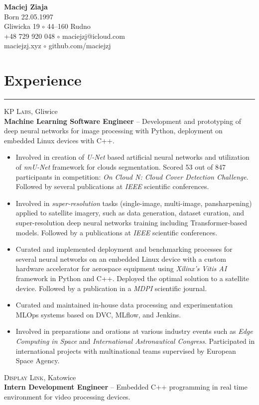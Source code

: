 \documentclass{article}
\begin{document}
\hfill
\begin{minipage}{0.5\textwidth}\raggedleft
	{\Large \textbf{Maciej Ziaja}} \\
	Born 22.05.1997 \\
	Gliwicka 19 $\circ$ 44--160 Rudno \\
	+48 729 920 048 $\circ$ maciejzj@icloud.com \\
	maciejzj.xyz $\circ$ github.com/maciejzj
\end{minipage}

\section*{Experience}

\hrule \medskip

\textsc{KP Labs}, Gliwice \\
\textbf{Machine Learning Software Engineer} -- Development and prototyping of
deep neural networks for image processing with Python, deployment on embedded
Linux devices with C++.
\begin{itemize}
	\item Involved in creation of \textit{U-Net} based artificial neural
		networks and utilization of \textit{nnU-Net} framework for clouds
		segmentation. Scored 53 out of 847 participants in competition:
		\textit{On Cloud N: Cloud Cover Detection Challenge}.
		Followed by several publications at \textit{IEEE} scientific conferences.
	\item Involved in \textit{super-resolution} tasks (single-image,
		multi-image, pansharpening) applied to satellite imagery, such as data
		generation, dataset curation, and super-resolution deep neural networks
		training including Transformer-based models. Followed by a publications
		at \textit{IEEE} scientific conferences.
	\item Curated and implemented deployment and benchmarking processes for
		several neural networks on an embedded Linux device with a custom
		hardware accelerator for aerospace equipment using \textit{Xilinx's Vitis
		AI} framework in Python and C++. Deployed the optimal solution to a
		satellite device. Followed by a publication in a \textit{MDPI}
		scientific journal.
	\item Curated and maintained in-house data processing and experimentation MLOps
		systems based on DVC, MLflow, and Jenkins.
	\item Involved in preparations and orations at various industry events such
		as \textit{Edge Computing in Space} and \textit{International
		Astronautical Congress}. Participated in international projects with
		multinational teams supervised by European Space Agency. 
\end{itemize}
\textsc{Display Link}, Katowice \\
\textbf{Intern Development Engineer} -- Embedded C++ programming in real time
environment for video processing devices.
\end{document}
